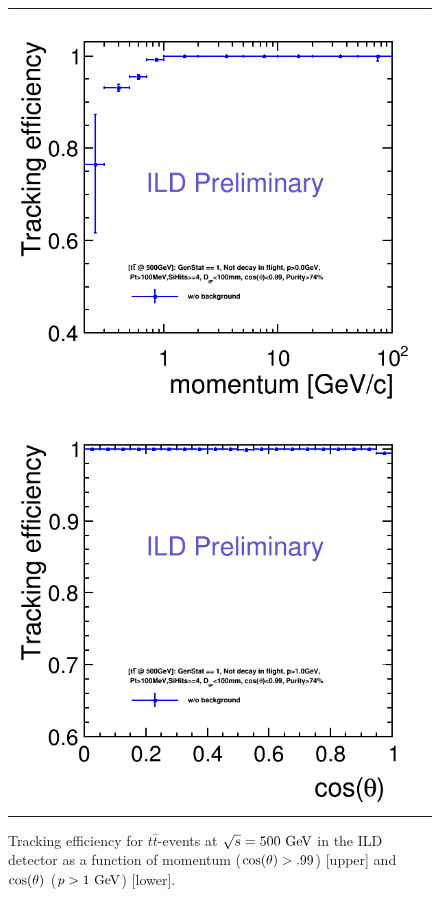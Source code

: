 \begin{figure}
  \begin{tabular}[c]{c}
    \includegraphics[width=0.85\hsize]{chapters/figures/trkEff_Momentum_ttbar_ILD_l5_v02_v02-00-02_New_publish_cuts2.png} \\
    \includegraphics[width=0.85\hsize]{chapters/figures/trkEff_theta_ttbar_ILD_l5_v02_v02-00-02_New_publish_cuts1.png}
\end{tabular}
  \caption{Tracking efficiency for $t\bar t$-events at $\sqrt{s}=500~\rm{GeV}$ in the ILD detector as a function of
    momentum ($\rm{cos}(\theta)>.99$) [upper]
    and $\rm{cos}(\theta)$ ($p>1~\rm{GeV}$) [lower].}

\label{fig:ild_trkeff}
\end{figure}


